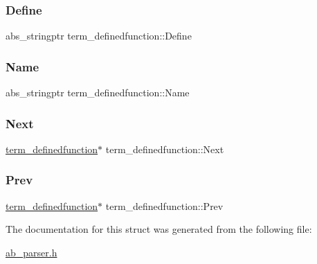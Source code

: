 \subsubsection{\texorpdfstring{Define}{Define}}
{\footnotesize\ttfamily abs\+\_\+stringptr term\+\_\+definedfunction\+::\+Define}

\mbox{\label{structterm__definedfunction_af6b99d4f43bb09f5d3340448e0daa489}} 
\subsubsection{\texorpdfstring{Name}{Name}}
{\footnotesize\ttfamily abs\+\_\+stringptr term\+\_\+definedfunction\+::\+Name}

\mbox{\label{structterm__definedfunction_ae4d62f23998fa05c8b5e4e900980460c}} 
\subsubsection{\texorpdfstring{Next}{Next}}
{\footnotesize\ttfamily \hyperlink{structterm__definedfunction}{term\+\_\+definedfunction}$\ast$ term\+\_\+definedfunction\+::\+Next}

\mbox{\label{structterm__definedfunction_a8f3ed1e8ae1fa3012452929ca8cb0da3}} 
\subsubsection{\texorpdfstring{Prev}{Prev}}
{\footnotesize\ttfamily \hyperlink{structterm__definedfunction}{term\+\_\+definedfunction}$\ast$ term\+\_\+definedfunction\+::\+Prev}



The documentation for this struct was generated from the following file\+:\begin{DoxyCompactItemize}
\item 
\hyperlink{ab__parser_8h}{ab\+\_\+parser.\+h}\end{DoxyCompactItemize}
